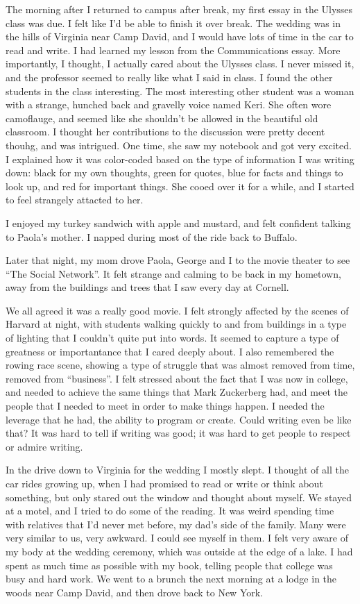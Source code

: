 The morning after I returned to campus after break, my first essay in the
Ulysses class was due.  I felt like I'd be able to finish it over break.  The
wedding was in the hills of Virginia near Camp David, and I would have lots of
time in the car to read and write.  I had learned my lesson from the
Communications essay.  More importantly, I thought, I actually cared about the
Ulysses class.  I never missed it, and the professor seemed to really like what
I said in class.  I found the other students in the class interesting.  The most
interesting other student was a woman with a strange, hunched back and gravelly
voice named Keri.  She often wore camoflauge, and seemed like she shouldn't be
allowed in the beautiful old classroom.  I thought her contributions to the
discussion were pretty decent thouhg, and was intrigued.  One time, she saw my
notebook and got very excited.  I explained how it was color-coded based on the
type of information I was writing down: black for my own thoughts, green for
quotes, blue for facts and things to look up, and red for important things.  She
cooed over it for a while, and I started to feel strangely attacted to her.

I enjoyed my turkey sandwich with apple and mustard, and felt confident talking
to Paola's mother.  I napped during most of the ride back to Buffalo.  

Later that night, my mom drove Paola, George and I to the movie theater to see
``The Social Network''.  It felt strange and calming to be back in my hometown,
away from the buildings and trees that I saw every day at Cornell.  

We all agreed it was a really good movie.  I felt strongly affected by the
scenes of Harvard at night, with students walking quickly to and from buildings
in a type of lighting that I couldn't quite put into words.  It seemed to
capture a type of greatness or importantance that I cared deeply about.  I also
remembered the rowing race scene, showing a type of struggle that was almost
removed from time, removed from ``business''.  I felt stressed about the fact
that I was now in college, and needed to achieve the same things that Mark
Zuckerberg had, and meet the people that I needed to meet in order to make
things happen.  I needed the leverage that he had, the ability to program or
create.  Could writing even be like that?  It was hard to tell if writing was
good; it was hard to get people to respect or admire writing.

In the drive down to Virginia for the wedding I mostly slept.  I thought of all
the car rides growing up, when I had promised to read or write or think about
something, but only stared out the window and thought about myself.  We stayed
at a motel, and I tried to do some of the reading.  It was weird spending time
with relatives that I'd never met before, my dad's side of the family.  Many
were very similar to us, very awkward.  I could see myself in them.  I felt very
aware of my body at the wedding ceremony, which was outside at the edge of a
lake.  I had spent as much time as possible with my book, telling people that
college was busy and hard work.  We went to a brunch the next morning at a lodge
in the woods near Camp David, and then drove back to New York.

